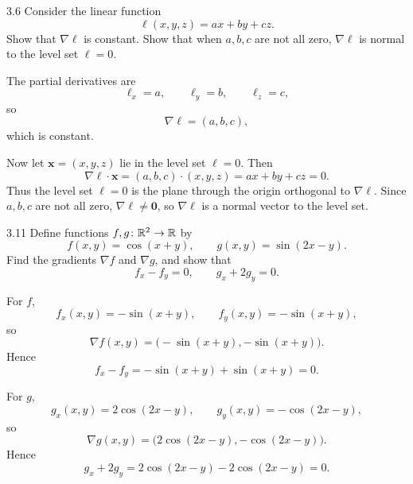 \documentclass[11pt,oneside]{article}
\begin{document}
\begin{problem}{3.6}
Consider the linear function
\[
    \ell(x,y,z)=ax+by+cz.
\]
Show that $\nabla\ell$ is constant. Show that when $a,b,c$ are not all zero, $\nabla\ell$ is normal to the level set $\ell=0$.
\end{problem}

\begin{solution}
The partial derivatives are
\[
    \ell_x=a,
    \qquad
    \ell_y=b,
    \qquad
    \ell_z=c,
\]
so
\[
    \boxed{\nabla\ell=(a,b,c)},
\]
which is constant.

Now let $\mathbf x=(x,y,z)$ lie in the level set $\ell=0$. Then
\[
    \nabla\ell\cdot\mathbf x
    =(a,b,c)\cdot(x,y,z)
    =ax+by+cz
    =0.
\]
Thus the level set $\ell=0$ is the plane through the origin orthogonal to $\nabla\ell$. Since $a,b,c$ are not all zero, $\nabla\ell\neq\mathbf 0$, so $\nabla\ell$ is a normal vector to the level set.
\end{solution}

\begin{problem}{3.11}
Define functions $f,g\colon\mathbb{R}^2\to\mathbb{R}$ by
\[
    f(x,y)=\cos(x+y),
    \qquad
    g(x,y)=\sin(2x-y).
\]
Find the gradients $\nabla f$ and $\nabla g$, and show that
\[
    f_x-f_y=0,
    \qquad
    g_x+2g_y=0.
\]
\end{problem}

\begin{solution}
For $f$,
\[
    f_x(x,y)=-\sin(x+y),
    \qquad
    f_y(x,y)=-\sin(x+y),
\]
so
\[
    \boxed{\nabla f(x,y)=\bigl(-\sin(x+y),-\sin(x+y)\bigr)}.
\]
Hence
\[
    f_x-f_y
    =-\sin(x+y)+\sin(x+y)
    =0.
\]

For $g$,
\[
    g_x(x,y)=2\cos(2x-y),
    \qquad
    g_y(x,y)=-\cos(2x-y),
\]
so
\[
    \boxed{\nabla g(x,y)=\bigl(2\cos(2x-y),-\cos(2x-y)\bigr)}.
\]
Hence
\[
    g_x+2g_y
    =2\cos(2x-y)-2\cos(2x-y)
    =0.
\]
\end{solution}
\end{document}
